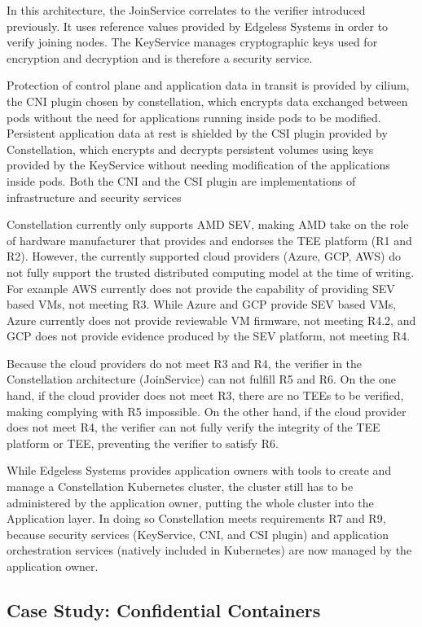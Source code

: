 In this architecture, the JoinService correlates to the verifier introduced
previously. It uses reference values provided by Edgeless Systems in order to
verify joining nodes. The KeyService manages cryptographic keys used for
encryption and decryption and is therefore a security service.

Protection of control plane and application data in transit is provided by
cilium, the CNI plugin chosen by constellation, which encrypts data exchanged
between pods without the need for applications running inside pods to be
modified. Persistent application data at rest is shielded by the CSI plugin
provided by Constellation, which encrypts and decrypts persistent volumes using
keys provided by the KeyService without needing modification of the applications
inside pods. Both the CNI and the CSI plugin are implementations of
infrastructure and security services

Constellation currently only supports AMD SEV, making AMD take on the role of
hardware manufacturer that provides and endorses the TEE platform (R1 and R2).
However, the currently supported cloud providers (Azure, GCP, AWS) do not fully
support the trusted distributed computing model at the time of writing. For
example AWS currently does not provide the capability of providing SEV based
VMs, not meeting R3. While Azure and GCP provide SEV based VMs, Azure currently
does not provide reviewable VM firmware, not meeting R4.2, and GCP does not
provide evidence produced by the SEV platform, not meeting R4.

Because the cloud providers do not meet R3 and R4, the verifier in the
Constellation architecture (JoinService) can not fulfill R5 and R6. On the one
hand, if the cloud provider does not meet R3, there are no TEEs to be verified,
making complying with R5 impossible. On the other hand, if the cloud provider
does not meet R4, the verifier can not fully verify the integrity of the TEE
platform or TEE, preventing the verifier to satisfy R6.

While Edgeless Systems provides application owners with tools to create and
manage a Constellation Kubernetes cluster, the cluster still has to be
administered by the application owner, putting the whole cluster into the
Application layer. In doing so Constellation meets requirements R7 and R9,
because security services (KeyService, CNI, and CSI plugin) and application
orchestration services (natively included in Kubernetes) are now managed by the
application owner.

\subsection{Case Study: Confidential Containers}

